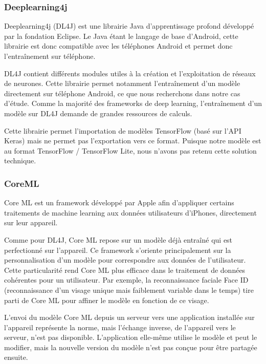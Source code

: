 \documentclass{article}
\begin{document}
\subsubsection{Deeplearning4j}

Deeplearning4j (DL4J) est une librairie Java d'apprentissage profond développé par la fondation Eclipse. Le Java étant le langage de base d'Android, cette librairie est donc compatible avec les téléphones Android et permet donc l'entraînement sur téléphone.\cite{AndroidDeepLearning}

DL4J contient différents modules utiles à la création et l'exploitation de réseaux de neurones. Cette librairie permet notamment l'entraînement d'un modèle directement sur téléphone Android, ce que nous recherchons dans notre cas d'étude. Comme la majorité des frameworks de deep learning, l'entraînement d'un modèle sur DL4J demande de grandes ressources de calculs.

Cette librairie permet l'importation de modèles TensorFlow (basé sur l'API Keras) mais ne permet pas l'exportation vers ce format. Puisque notre modèle est au format TensorFlow / TensorFlow Lite, nous n'avons pas retenu cette solution technique.\cite{EclipsefoundationKerasImportOverview} 

\subsubsection{CoreML}

Core ML est un framework développé par Apple afin d'appliquer certains traitements de machine learning aux données utilisateurs d'iPhones, directement sur leur appareil.

Comme pour DL4J, Core ML repose sur un modèle déjà entraîné qui est perfectionné sur l'appareil. Ce framework s'oriente principalement sur la personnalisation d'un modèle pour correspondre aux données de l'utilisateur. Cette particularité rend Core ML plus efficace dans le traitement de données cohérentes pour un utilisateur. Par exemple, la reconnaissance faciale Face ID (reconnaissance d'un visage unique mais faiblement variable dans le temps) tire parti de Core ML pour affiner le modèle en fonction de ce visage.\cite{MatthijsHollemansTrainingIOSdevice}

L'envoi du modèle Core ML depuis un serveur vers une application installée sur l'appareil représente la norme, mais l'échange inverse, de l'appareil vers le serveur, n'est pas disponible. L'application elle-même utilise le modèle et peut le modifier, mais la nouvelle version du modèle n'est pas conçue pour être partagée ensuite.
\end{document}
